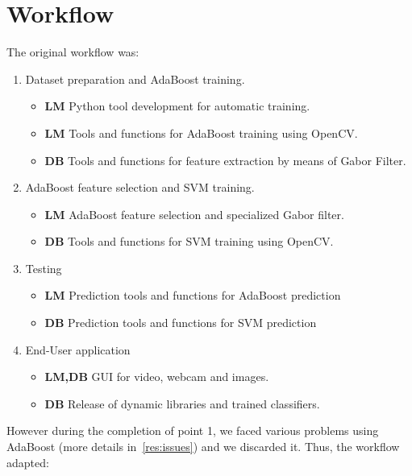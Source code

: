 \section{Workflow}

The original workflow was:

\begin{enumerate}
  \item Dataset preparation and AdaBoost training.
    \begin{itemize}
      \item \textbf{LM} Python tool development for automatic training.
      \item \textbf{LM} Tools and functions for AdaBoost training using OpenCV.
      \item \textbf{DB} Tools and functions for feature extraction by means of Gabor Filter.
    \end{itemize}
  \item AdaBoost feature selection and SVM training.
    \begin{itemize}
      \item \textbf{LM} AdaBoost feature selection and specialized Gabor filter.
      \item \textbf{DB} Tools and functions for SVM training using OpenCV.
    \end{itemize}
  \item Testing
    \begin{itemize}
      \item \textbf{LM} Prediction tools and functions for AdaBoost prediction
      \item \textbf{DB} Prediction tools and functions for SVM prediction
    \end{itemize}
  \item End-User application
    \begin{itemize}
      \item \textbf{LM,DB} GUI for video, webcam and images.
      \item \textbf{DB} Release of dynamic libraries and trained classifiers.
    \end{itemize}
\end{enumerate}

However during the completion of point 1, we faced various problems using
AdaBoost (more details in~\ref{res:issues}) and we discarded it. Thus, the
workflow adapted:

